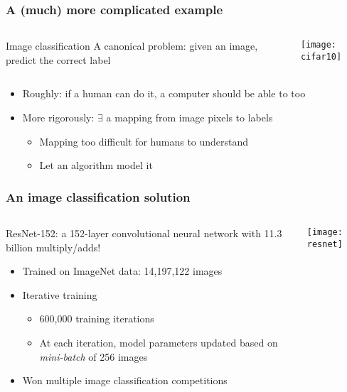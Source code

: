 \begin{frame}
    \frametitle{A (much) more complicated example}
    \begin{columns}
        \begin{column}{0.37\textwidth}
            \begin{block}{Image classification}
                A canonical problem: given an image, predict the correct label
            \end{block}
        \end{column}
        \begin{column}{0.63\textwidth}
            \texttt{[image: cifar10]}
        \end{column}
    \end{columns}

    \begin{itemize}
        \item Roughly: if a human can do it, a computer should be able to too
        \item More rigorously: $\exists$ a mapping from image pixels to labels
        \begin{itemize}
            \item Mapping too difficult for humans to understand
            \item Let an algorithm model it
        \end{itemize}
    \end{itemize}
\end{frame}

\begin{frame}
    \frametitle{An image classification solution}

    \begin{columns}
        \begin{column}{0.7\textwidth}
            ResNet-152: a 152-layer convolutional neural network with 11.3 billion multiply/adds! \citep{He15}
            \begin{itemize}
                \item Trained on ImageNet data: 14,197,122 images
                \item Iterative training
                \begin{itemize}
                    \item 600,000 training iterations
                    \item At each iteration, model parameters updated based on \emph{mini-batch} of 256 images
                \end{itemize}
                \item Won multiple image classification competitions
            \end{itemize}
        \end{column}
        \begin{column}{0.3\textwidth}
            \texttt{[image: resnet]}
        \end{column}
    \end{columns}
\end{frame}

